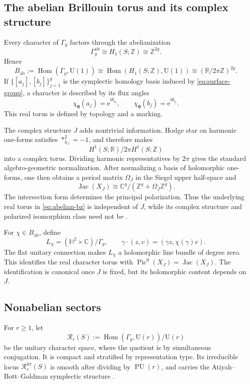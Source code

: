 \documentclass[11pt]{article}
\theoremstyle{definition}
\theoremstyle{remark}
\newcommand{\HH}{\mathbb H}
\newcommand{\CC}{\mathbb C}
\newcommand{\RR}{\mathbb R}
\newcommand{\ZZ}{\mathbb Z}
\newcommand{\UU}{\mathrm U}
\newcommand{\Jac}{\operatorname{Jac}}
\newcommand{\Pic}{\operatorname{Pic}}
\newcommand{\Hom}{\operatorname{Hom}}
\newcommand{\cR}{\mathcal R}
\newcommand{\ii}{\mathrm i}
\newcommand{\e}{\mathrm e}
\begin{document}
\subsection{The abelian Brillouin torus and its complex structure}

Every character of \(\Gamma_g\) factors through the abelianization
\[
     \Gamma_g^{\mathrm{ab}}\cong H_1(S;\ZZ)\cong\ZZ^{2g}.
\]
Hence
\[
 B_{\mathrm{ab}}
 :=\Hom(\Gamma_g,\UU(1))
 \cong \Hom(H_1(S;\ZZ),\UU(1))
 \cong (\RR/2\pi\ZZ)^{2g}.
 \tag{2.3}\label{eq:abelian-bz}
\]
If \(\{[a_j],[b_j]\}_{j=1}^g\) is the symplectic homology basis induced by
\eqref{eq:surface-group}, a character is described by its flux angles
\[
  \chi_{\bm\theta}(a_j)=\e^{\ii\theta_{a_j}},
  \qquad
  \chi_{\bm\theta}(b_j)=\e^{\ii\theta_{b_j}}.
\]
This real torus is defined by topology and a marking.

The complex structure \(J\) adds nontrivial information.  Hodge star on
harmonic one-forms satisfies \(*_{h_J}^2=-1\), and therefore makes
\[
 H^1(S;\RR)/2\pi H^1(S;\ZZ)
\]
into a complex torus.  Dividing harmonic representatives by \(2\pi\) gives
the standard algebro-geometric normalization.  After normalizing a basis of
holomorphic one-forms, one then obtains a period matrix \(\Omega_J\) in the
Siegel upper half-space and
\[
               \Jac(X_J)\cong
               \CC^g/(\ZZ^g+\Omega_J\ZZ^g).
               \tag{2.4}\label{eq:period-jac}
\]
The intersection form determines the principal polarization.  Thus the
underlying real torus in \eqref{eq:abelian-bz} is independent of \(J\), while
its complex structure and polarized isomorphism class need not be
\cite{FarkasKra,BirkenhakeLange}.

For \(\chi\in B_{\mathrm{ab}}\), define
\[
 L_\chi=(\HH^2\times\CC)/\Gamma_g,
 \qquad
 \gamma\cdot(z,v)=(\gamma z,\chi(\gamma)v).
 \tag{2.5}\label{eq:flat-line}
\]
The flat unitary connection makes \(L_\chi\) a holomorphic line bundle of
degree zero.  This identifies the real character torus with
\(\Pic^0(X_J)=\Jac(X_J)\).  The identification is canonical once \(J\) is
fixed, but its holomorphic content depends on \(J\).

\subsection{Nonabelian sectors}

For \(r\geq1\), let
\[
 \cR_r(S):=\Hom(\Gamma_g,\UU(r))/\UU(r)
 \tag{2.6}\label{eq:unitary-character}
\]
be the unitary character space, where the quotient is by simultaneous
conjugation.  It is compact and stratified by representation type.  Its
irreducible locus \(\cR_r^{\mathrm{irr}}(S)\) is smooth after dividing by
\(\operatorname{PU}(r)\), and carries the Atiyah--Bott--Goldman symplectic
structure \cite{AtiyahBott,GoldmanSymplectic}.
\end{document}
